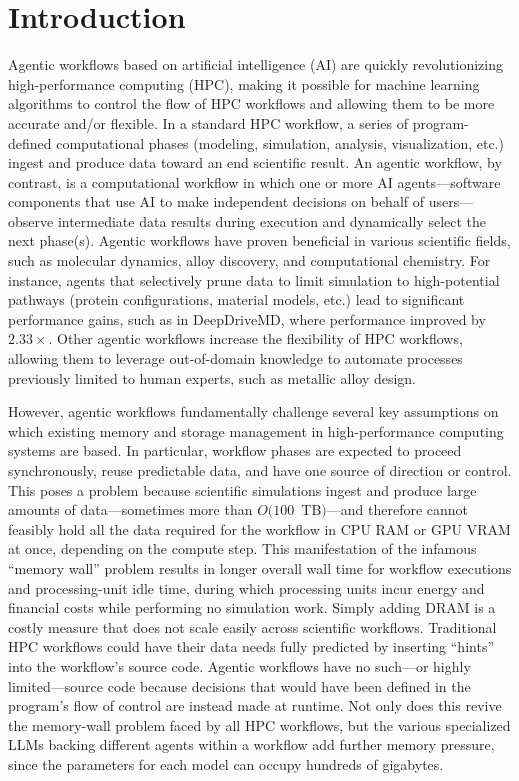 \section{Introduction}

Agentic workflows based on artificial intelligence (AI) are quickly
revolutionizing high-performance computing (HPC), making it possible for
machine learning algorithms to control the flow of HPC workflows and allowing
them to be more accurate and/or flexible. In a standard HPC workflow, a series
of program-defined computational phases (modeling, simulation, analysis,
visualization, etc.) ingest and produce data toward an end scientific result.
An agentic workflow, by contrast, is a computational workflow in which one or
more AI agents---software components that use AI to make independent decisions
on behalf of users---observe intermediate data results during execution and
dynamically select the next phase(s). Agentic workflows have proven beneficial
in various scientific fields, such as molecular dynamics, alloy discovery, and
computational chemistry. For instance, agents that selectively prune data to
limit simulation to high-potential pathways (protein configurations, material
models, etc.) lead to significant performance gains, such as in DeepDriveMD,
where performance improved by $2.33\times$. Other agentic workflows increase
the flexibility of HPC workflows, allowing them to leverage out-of-domain
knowledge to automate processes previously limited to human experts, such as
metallic alloy design.

However, agentic workflows fundamentally challenge several key assumptions on
which existing memory and storage management in high-performance computing
systems are based. In particular, workflow phases are expected to proceed
synchronously, reuse predictable data, and have one source of direction or
control. This poses a problem because scientific simulations ingest and
produce large amounts of data---sometimes more than $O(100$~TB$)$---and
therefore cannot feasibly hold all the data required for the workflow in CPU
RAM or GPU VRAM at once, depending on the compute step. This manifestation of
the infamous ``memory wall'' problem results in longer overall wall time for
workflow executions and processing-unit idle time, during which processing
units incur energy and financial costs while performing no simulation work.
Simply adding DRAM is a costly measure that does not scale easily across
scientific workflows. Traditional HPC workflows could have their data needs
fully predicted by inserting ``hints'' into the workflow's source code.
Agentic workflows have no such---or highly limited---source code because
decisions that would have been defined in the program's flow of control are
instead made at runtime. Not only does this revive the memory-wall problem
faced by all HPC workflows, but the various specialized LLMs backing different
agents within a workflow add further memory pressure, since the parameters for
each model can occupy hundreds of gigabytes.

